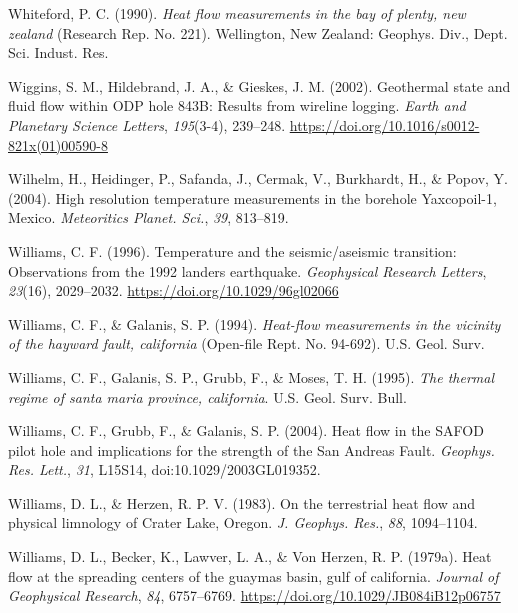 \documentclass[draft,linenumbers]{agujournal2018}
\begin{document}
\leavevmode{}%
Whiteford, P. C. (1990). \emph{Heat flow measurements in the bay of
plenty, new zealand} (Research Rep. No. 221). Wellington, New Zealand:
Geophys. Div., Dept. Sci. Indust. Res.

\leavevmode{}%
Wiggins, S. M., Hildebrand, J. A., \& Gieskes, J. M. (2002). Geothermal
state and fluid flow within ODP hole 843B: Results from wireline
logging. \emph{Earth and Planetary Science Letters}, \emph{195}(3-4),
239--248. \url{https://doi.org/10.1016/s0012-821x(01)00590-8}

\leavevmode{}%
Wilhelm, H., Heidinger, P., Safanda, J., Cermak, V., Burkhardt, H., \&
Popov, Y. (2004). High resolution temperature measurements in the
borehole {Yaxcopoil-1, Mexico}. \emph{Meteoritics Planet. Sci.},
\emph{39}, 813--819.

\leavevmode{}%
Williams, C. F. (1996). Temperature and the seismic/aseismic transition:
Observations from the 1992 landers earthquake. \emph{Geophysical
Research Letters}, \emph{23}(16), 2029--2032.
\url{https://doi.org/10.1029/96gl02066}

\leavevmode{}%
Williams, C. F., \& Galanis, S. P. (1994). \emph{Heat-flow measurements
in the vicinity of the hayward fault, california} (Open-file Rept. No.
94-692). U.S. Geol. Surv.

\leavevmode{}%
Williams, C. F., Galanis, S. P., Grubb, F., \& Moses, T. H. (1995).
\emph{The thermal regime of santa maria province, california}. U.S.
Geol. Surv. Bull.

\leavevmode{}%
Williams, C. F., Grubb, F., \& Galanis, S. P. (2004). Heat flow in the
{SAFOD} pilot hole and implications for the strength of the {San Andreas
Fault}. \emph{Geophys. Res. Lett.}, \emph{31}, L15S14,
doi:10.1029/2003GL019352.

\leavevmode{}%
Williams, D. L., \& Herzen, R. P. V. (1983). On the terrestrial heat
flow and physical limnology of {Crater Lake, Oregon}. \emph{J. Geophys.
Res.}, \emph{88}, 1094--1104.

\leavevmode{}%
Williams, D. L., Becker, K., Lawver, L. A., \& Von Herzen, R. P.
(1979a). Heat flow at the spreading centers of the guaymas basin, gulf
of california. \emph{Journal of Geophysical Research}, \emph{84},
6757--6769. \url{https://doi.org/10.1029/JB084iB12p06757}
\end{document}
